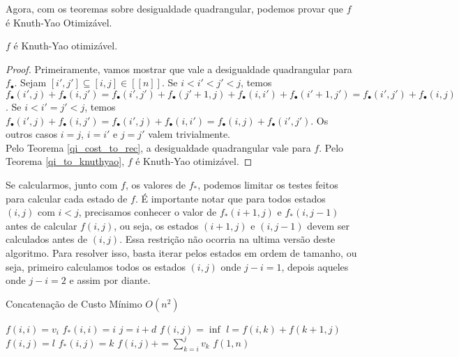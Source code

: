 Agora, com os teoremas sobre desigualdade quadrangular, podemos provar que $f$ é Knuth-Yao Otimizável.

\begin{prop}
$f$ é Knuth-Yao otimizável.
\end{prop}

\begin{proof}
Primeiramente, vamos mostrar que vale a desigualdade quadrangular para $f_\bullet$. Sejam $[i',j'] \subseteq [i,j] \in [[n]]$. Se $i < i' < j' < j$, temos $f_\bullet(i',j) + f_\bullet(i,j') = f_\bullet(i',j') + f_\bullet(j'+1,j) + f_\bullet(i,i') + f_\bullet(i'+1,j') = f_\bullet(i',j') + f_\bullet(i,j)$. Se $i < i' = j' < j$, temos $f_\bullet(i',j) + f_\bullet(i,j') = f_\bullet(i',j) + f_\bullet(i,i') = f_\bullet(i,j) + f_\bullet(i',j')$. Os outros casos $i = j$, $i = i'$ e $j = j'$ valem trivialmente. \\
Pelo Teorema \ref{qi_cost_to_rec}, a desigualdade quadrangular vale para $f$. Pelo Teorema \ref{qi_to_knuthyao}, $f$ é Knuth-Yao otimizável.
\end{proof}

Se calcularmos, junto com $f$, os valores de $f_*$, podemos limitar os testes feitos para calcular cada estado de $f$. É importante notar que para todos estados $(i,j)$ com $i < j$, precisamos conhecer o valor de $f_*(i+1, j)$ e $f_*(i,j-1)$ antes de calcular $f(i,j)$, ou seja, os estados $(i+1,j)$ e $(i,j-1)$ devem ser calculados antes de $(i,j)$. Essa restrição não ocorria na ultima versão deste algoritmo. Para resolver isso, basta iterar pelos estados em ordem de tamanho, ou seja, primeiro calculamos todos os estados $(i,j)$ onde $j-i = 1$, depois aqueles onde $j-i = 2$ e assim por diante.

\begin{algorithm}[H]
\caption{Concatenação de Custo Mínimo $O(n^2)$}
\label{alg_MinCostConcatOpt}
\begin{algorithmic}[1]
        \State $f(i,i) = v_i$
        \State $f_*(i,i) = i$
    \EndFor
            \State $j = i+d$
            \State $f(i,j) = \inf$
                \State $l = f(i,k) + f(k+1,j)$
                    \State $f(i,j) = l$
                    \State $f_*(i,j) = k$
                \EndIf
            \EndFor
            \State $f(i,j) += \sum\limits_{k=i}^j v_k$
        \EndFor
    \EndFor
    \State \Return $f(1,n)$
\EndFunction
\end{algorithmic}
\end{algorithm}

